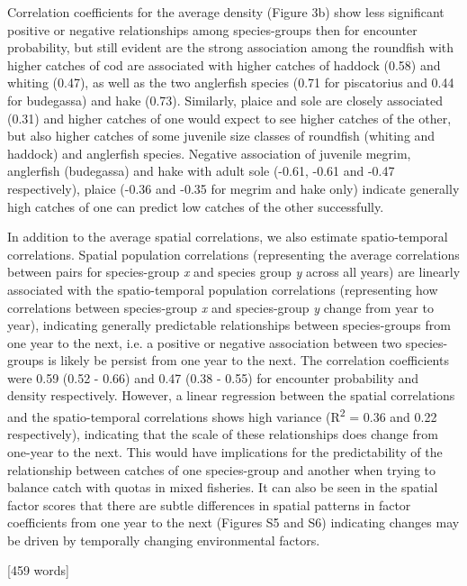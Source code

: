 \documentclass{nature}
\begin{document}
\begin{linenumbers}
Correlation coefficients for the average density (Figure 3b) show less
significant positive or negative relationships among species-groups then for
encounter probability, but still evident are the strong association among the
roundfish with higher catches of cod are associated with higher catches of
haddock (0.58) and whiting (0.47), as well as the two anglerfish species (0.71
for piscatorius and 0.44 for budegassa) and hake (0.73). Similarly, plaice and
sole are closely associated (0.31) and higher catches of one would expect to
see higher catches of the other, but also higher catches of some juvenile size
classes of roundfish (whiting and haddock) and anglerfish species. Negative
association of juvenile megrim, anglerfish (budegassa) and hake with adult sole
(-0.61, -0.61 and -0.47 respectively), plaice (-0.36 and -0.35 for megrim and
hake only) indicate generally high catches of one can predict low catches of
the other successfully.

In addition to the average spatial correlations, we also estimate
spatio-temporal correlations. Spatial population correlations (representing the
average correlations between pairs for species-group \textit{x} and species
group \textit{y} across all years) are linearly associated with the
spatio-temporal population correlations (representing how correlations between
species-group \textit{x} and species-group \textit{y} change from year to
year), indicating generally predictable relationships between species-groups
from one year to the next, i.e. a positive or negative association between two
species-groups is likely be persist from one year to the next. The correlation
coefficients were 0.59 (0.52 - 0.66) and 0.47 (0.38 - 0.55) for encounter
probability and density respectively.  However, a linear regression between the
spatial correlations and the spatio-temporal correlations shows high variance
(R\textsuperscript{2} = 0.36 and 0.22 respectively), indicating that the scale
of these relationships does change from one-year to the next. This would have
implications for the predictability of the relationship between catches of one
species-group and another when trying to balance catch with quotas in mixed
fisheries. It can also be seen in the spatial factor scores that there are
subtle differences in spatial patterns in factor coefficients from one year to
the next (Figures S5 and S6) indicating changes may be driven by temporally
changing environmental factors.

[459 words]



\end{linenumbers}
\end{document}
